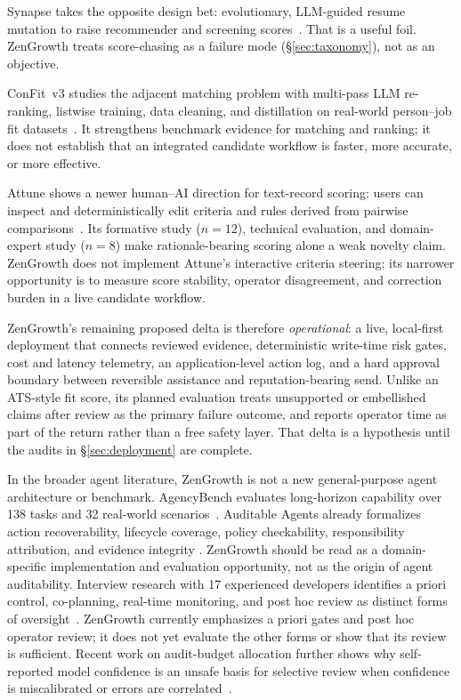 \documentclass[11pt]{article}
\begin{document}
Synapse takes the opposite design bet: evolutionary, LLM-guided resume
mutation to raise recommender and screening scores~\citep{erol2026synapse}.
That is a useful foil. ZenGrowth treats score-chasing as a failure mode
(\S\ref{sec:taxonomy}), not as an objective.

ConFit~v3 studies the adjacent matching problem with multi-pass LLM re-ranking,
listwise training, data cleaning, and distillation on real-world person--job
fit datasets~\citep{yu2026confit}. It strengthens benchmark evidence for
matching and ranking; it does not establish that an integrated candidate
workflow is faster, more accurate, or more effective.

Attune shows a newer human--AI direction for text-record scoring: users can
inspect and deterministically edit criteria and rules derived from pairwise
comparisons~\citep{chopra2026attune}. Its formative study ($n=12$), technical
evaluation, and domain-expert study ($n=8$) make rationale-bearing scoring
alone a weak novelty claim. ZenGrowth does not implement Attune's interactive
criteria steering; its narrower opportunity is to measure score stability,
operator disagreement, and correction burden in a live candidate workflow.

ZenGrowth's remaining proposed delta is therefore \emph{operational}: a live,
local-first deployment that connects reviewed evidence, deterministic
write-time risk gates, cost and latency telemetry, an application-level action
log, and a hard approval boundary between reversible assistance and
reputation-bearing send. Unlike an ATS-style fit score, its planned evaluation
treats unsupported or embellished claims after review as the primary failure
outcome, and reports operator time as part of the return rather than a free
safety layer. That delta is a hypothesis until the audits in
\S\ref{sec:deployment} are complete.

In the broader agent literature, ZenGrowth is not a new general-purpose agent
architecture or benchmark. AgencyBench evaluates long-horizon capability over
138 tasks and 32 real-world scenarios~\citep{li2026agencybench}. Auditable
Agents already formalizes action recoverability, lifecycle coverage, policy
checkability, responsibility attribution, and evidence integrity
\citep{nian2026auditable}. ZenGrowth should be read as a domain-specific
implementation and evaluation opportunity, not as the origin of agent
auditability. Interview research with 17 experienced developers identifies a
priori control, co-planning, real-time monitoring, and post hoc review as
distinct forms of oversight~\citep{dhanorkar2026oversight}. ZenGrowth currently
emphasizes a priori gates and post hoc operator review; it does not yet
evaluate the other forms or show that its review is sufficient.
Recent work on audit-budget allocation further shows why self-reported model
confidence is an unsafe basis for selective review when confidence is
miscalibrated or errors are correlated~\citep{zavattari2026auditbudget}.
\end{document}
